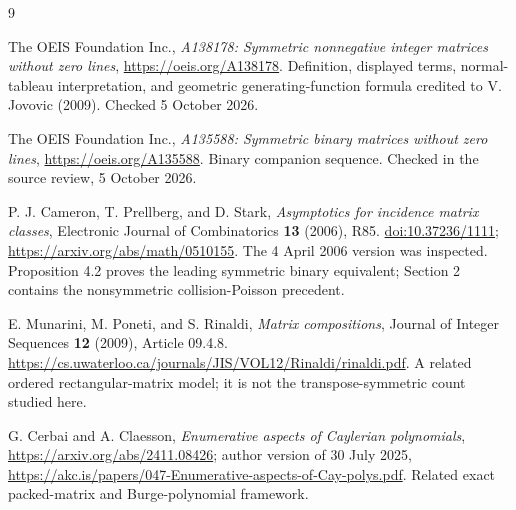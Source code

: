 \begin{thebibliography}{9}
The OEIS Foundation Inc., \emph{A138178: Symmetric nonnegative integer matrices without zero lines},
\url{https://oeis.org/A138178}. Definition, displayed terms, normal-tableau interpretation, and geometric generating-function formula credited to V. Jovovic (2009). Checked 5 October 2026.

The OEIS Foundation Inc., \emph{A135588: Symmetric binary matrices without zero lines},
\url{https://oeis.org/A135588}. Binary companion sequence. Checked in the source review, 5 October 2026.

P. J. Cameron, T. Prellberg, and D. Stark,
\emph{Asymptotics for incidence matrix classes},
Electronic Journal of Combinatorics \textbf{13} (2006), R85.
\href{https://doi.org/10.37236/1111}{doi:10.37236/1111};
\url{https://arxiv.org/abs/math/0510155}.
The 4 April 2006 version was inspected. Proposition 4.2 proves the leading symmetric binary equivalent; Section 2 contains the nonsymmetric collision-Poisson precedent.

E. Munarini, M. Poneti, and S. Rinaldi,
\emph{Matrix compositions},
Journal of Integer Sequences \textbf{12} (2009), Article 09.4.8.
\url{https://cs.uwaterloo.ca/journals/JIS/VOL12/Rinaldi/rinaldi.pdf}.
A related ordered rectangular-matrix model; it is not the transpose-symmetric count studied here.

G. Cerbai and A. Claesson,
\emph{Enumerative aspects of Caylerian polynomials},
\url{https://arxiv.org/abs/2411.08426};
author version of 30 July 2025,
\url{https://akc.is/papers/047-Enumerative-aspects-of-Cay-polys.pdf}.
Related exact packed-matrix and Burge-polynomial framework.
\end{thebibliography}
